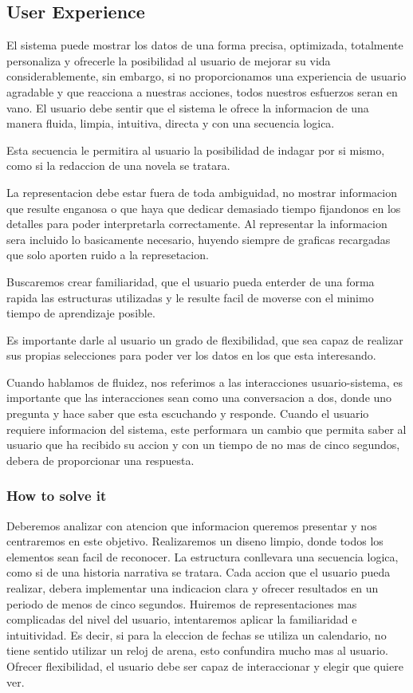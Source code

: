 \subsection{User Experience}
 El sistema puede mostrar los datos de una forma precisa, optimizada, totalmente personaliza y ofrecerle
 la posibilidad al usuario de mejorar su vida considerablemente, sin embargo, si no proporcionamos una experiencia
 de usuario agradable y que reacciona a nuestras acciones, todos nuestros esfuerzos seran en vano.
 El usuario debe sentir que el sistema le ofrece la informacion de una manera fluida, limpia, intuitiva, directa y con
 una secuencia logica.
  
Esta secuencia le permitira al usuario la posibilidad de indagar por si mismo, como si la redaccion de una novela se tratara.

La representacion debe estar fuera de toda ambiguidad, no mostrar informacion que resulte enganosa o que haya que dedicar 
demasiado tiempo fijandonos en los detalles para poder interpretarla correctamente. Al representar la informacion sera 
incluido lo basicamente necesario, huyendo siempre de graficas recargadas que solo aporten ruido a la represetacion.

Buscaremos crear familiaridad, que el usuario pueda enterder de una forma rapida las estructuras utilizadas y 
le resulte facil de moverse con el minimo tiempo de aprendizaje posible.

Es importante darle al usuario un grado de flexibilidad, que sea capaz de realizar sus propias selecciones para poder ver
los datos en los que esta interesando.

Cuando hablamos de fluidez, nos referimos a las interacciones usuario-sistema, es importante que las interacciones
sean como una conversacion a dos, donde uno pregunta y hace saber que esta escuchando y responde. Cuando el usuario 
requiere informacion del sistema, este performara un cambio que permita saber al usuario que ha recibido su accion y
con un tiempo de no mas de cinco segundos, debera de proporcionar una respuesta.

    
\subsubsection{How to solve it} 
Deberemos analizar con atencion que informacion queremos presentar y nos centraremos en este objetivo. Realizaremos un 
diseno limpio, donde todos los elementos sean facil de reconocer.
La estructura conllevara una secuencia logica, como si de una historia narrativa se tratara. 
Cada accion que el usuario pueda realizar, debera implementar una indicacion clara y ofrecer resultados en un 
periodo de menos de cinco segundos.
Huiremos de representaciones mas complicadas del nivel del usuario, intentaremos aplicar la familiaridad e intuitividad.
Es decir, si para la eleccion de fechas se utiliza un calendario, no tiene sentido utilizar un reloj de arena, esto confundira
mucho mas al usuario.
Ofrecer flexibilidad, el usuario debe ser capaz de interaccionar y elegir que quiere ver.

